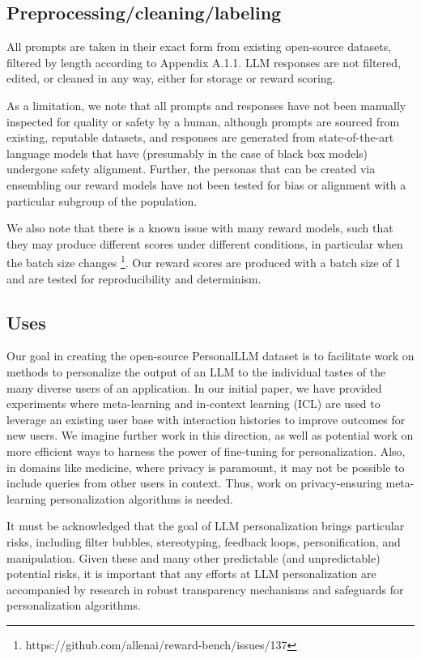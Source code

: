 \subsection{Preprocessing/cleaning/labeling}

All prompts are taken in their exact form from existing open-source datasets, filtered by length according to Appendix A.1.1.  LLM responses are not filtered, edited, or cleaned in any way, either for storage or reward scoring.  

As a limitation, we note that all prompts and responses have not been manually inspected for quality or safety by a human, although prompts are sourced from existing, reputable datasets, and responses are generated from state-of-the-art language models that have (presumably in the case of black box models) undergone safety alignment.  Further, the personas that can be created via ensembling our reward models have not been tested for bias or alignment with a particular subgroup of the population.

We also note that there is a known issue with many reward models, such that they may produce different scores under different conditions, in particular when the batch size changes \footnote{https://github.com/allenai/reward-bench/issues/137}.  Our reward scores are produced with a batch size of 1 and are tested for reproducibility and determinism.

\subsection{Uses}

Our goal in creating the open-source PersonalLLM dataset is to facilitate work on methods to personalize the output of an LLM to the individual tastes of the many diverse users of an application.
In our initial paper, we have provided experiments where meta-learning and in-context learning (ICL) are used to leverage an existing user base with interaction histories to improve outcomes for new users.
We imagine further work in this direction, as well as potential work on more efficient ways to harness the power of fine-tuning for personalization. Also, in domains like medicine, where privacy is paramount, it may not be possible to include queries from other users in context.  Thus, work on privacy-ensuring meta-learning personalization algorithms is needed. 

It must be acknowledged that the goal of LLM personalization brings particular risks, including filter bubbles, stereotyping, feedback loops, personification, and manipulation.
Given these and many other predictable (and unpredictable) potential risks, it is important that any efforts at LLM personalization are accompanied by research in robust transparency mechanisms and safeguards for personalization algorithms.

